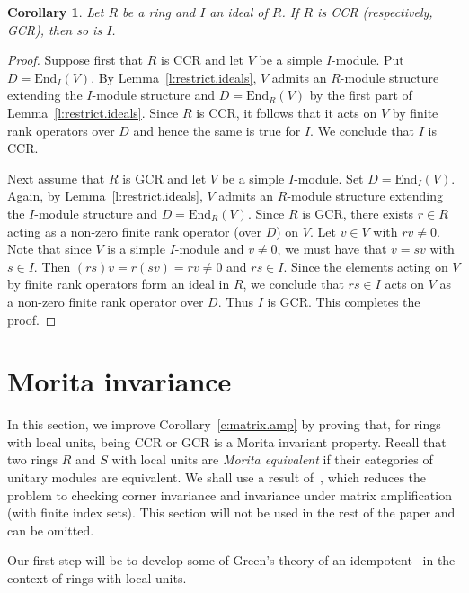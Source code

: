 \documentclass[11pt,reqno]{amsart}
\theoremstyle{plain}
\newtheorem{cor}[thm]{Corollary}
{\theoremstyle{definition}
\newtheorem{dfn}[thm]{Definition}}
{\theoremstyle{remark}
\newtheorem{ex}[thm]{Example}}
{\theoremstyle{remark}
\newtheorem*{ex*}{Example}}
{\theoremstyle{definition}
\newtheorem{note}[thm]{Note}}
{\theoremstyle{remark}
\newtheorem{remark}[thm]{Remark}}
\numberwithin{equation}{section}
\begin{document}
\begin{cor}\label{c:ideal.inherit}
Let $R$ be a ring and $I$ an ideal of $R$.  If $R$ is CCR (respectively, GCR), then so is $I$.
\end{cor}
\begin{proof}
Suppose first that $R$ is CCR and let $V$ be a simple $I$-module.  Put $D=\mathrm{End}_I(V)$.  By Lemma~\ref{l:restrict.ideals}, $V$ admits an $R$-module structure extending the $I$-module structure and $D=\mathrm{End}_R(V)$ by the first part of Lemma~\ref{l:restrict.ideals}.  Since $R$ is CCR, it follows that it acts on $V$ by finite rank operators over $D$ and hence the same is true for $I$.  We conclude that $I$ is CCR.

Next assume that $R$ is GCR and let $V$ be a simple $I$-module.  Set $D=\mathrm{End}_I(V)$. Again, by Lemma~\ref{l:restrict.ideals}, $V$ admits an $R$-module structure extending the $I$-module structure and $D=\mathrm{End}_R(V)$.  Since $R$ is GCR, there exists $r\in R$ acting as a non-zero finite rank operator (over $D$) on $V$.  Let $v\in V$ with $rv\neq 0$. Note that since $V$ is a simple $I$-module and $v\neq 0$, we must have that $v=sv$ with $s\in I$.  Then $(rs)v=r(sv)=rv\neq 0$ and $rs\in I$.  Since the elements acting on $V$ by finite rank operators form an ideal in $R$, we conclude that $rs\in I$ acts on $V$ as a non-zero finite rank operator over $D$.  Thus $I$ is GCR.  This completes the proof.
\end{proof}

\section{Morita invariance}\label{sec:Morita}
In this section, we improve Corollary~\ref{c:matrix.amp} by proving that, for rings with local units, being CCR or GCR is a Morita invariant property.  Recall that two rings $R$ and $S$ with local units are \emph{Morita equivalent} if their categories of unitary modules are equivalent. We shall use a result of~\cite{SS16}, which reduces the problem to checking corner invariance and invariance under matrix amplification (with finite index sets).  This section will not be used in the rest of the paper and can be omitted.

Our first step will be to develop some of Green's theory of an idempotent~\cite[Chapter~6]{Gr07} in the context of rings with local units.
\end{document}
